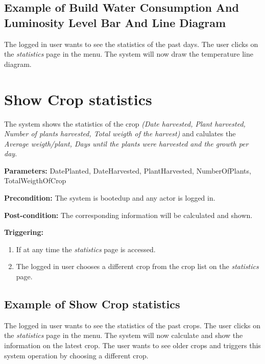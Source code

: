 \subsection{Example of Build Water Consumption And Luminosity Level Bar And Line
Diagram}
The logged in user wants to see the statistics of the past days.
The user clicks on the \emph{statistics} page in the menu.
The system will now draw the temperature line diagram.




\section{Show Crop statistics}
\label{operation:ShowCropStatistics}
The system shows the statistics of the crop \emph{(Date harvested, Plant
harvested, Number of plants harvested, Total weigth of the harvest)} and
calulates the \emph{Average weigth/plant, Days until the plants were harvested
and the growth per day}.

\begin{description}

\item \textbf{Parameters:} DatePlanted, DateHarvested, PlantHarvested,
NumberOfPlants, TotalWeigthOfCrop
\item \textbf{Precondition:} The system is bootedup and any actor is logged in.
\item \textbf{Post-condition:} The corresponding information will be calculated
and shown.

\item \textbf{Triggering:}
\begin{enumerate}
\item If at any time the \emph{statistics} page is accessed.
\item The logged in user chooses a different crop from the crop list on the
\emph{statistics} page.
\end{enumerate}
\end{description}


\subsection{Example of Show Crop statistics}
The logged in user wants to see the statistics of the past crops.
The user clicks on the \emph{statistics} page in the menu.
The system will now calculate and show the information on the latest crop.
The user wants to see older crops and triggers this system operation by choosing
a different crop.



